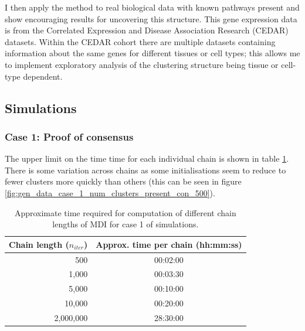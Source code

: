 \documentclass[14pt]{extarticle} %
\begin{document}
	I then apply the method to real biological data with known pathways present and show encouraging results for uncovering this structure. This gene expression data is from the Correlated Expression and Disease Association Research (CEDAR) datasets. Within the CEDAR cohort there are multiple datasets containing information about the same genes for different tissues or cell types; this allows me to implement exploratory analysis of the clustering structure being tissue or cell-type dependent.
	
	\subsection{Simulations}
	\subsubsection{Case 1: Proof of consensus} \label{sec:results:case_1}
	The upper limit on the time time for each individual chain is shown in table \ref{table:results:sim_1:timing}. There is some variation across chains as some initialisations seem to reduce to fewer clusters more quickly than others (this can be seen in figure \ref{fig:gen_data_case_1_num_clusters_present_con_500}).
	
	\begin{table}[!htb] 
		\centering
		\begin{tabular}{r|c} 
			Chain length ($n_{iter}$)	& Approx. time per chain (hh:mm:ss)\\ 
			\hline
			500							& 00:02:00 \\
			1,000						& 00:03:30 \\
			5,000						& 00:10:00 \\
			10,000						& 00:20:00 \\
			2,000,000					& 28:30:00
		\end{tabular}
		\caption{Approximate time required for computation of different chain lengths of MDI for case 1 of simulations.}
		\label{table:results:sim_1:timing}
	\end{table}
\end{document}
